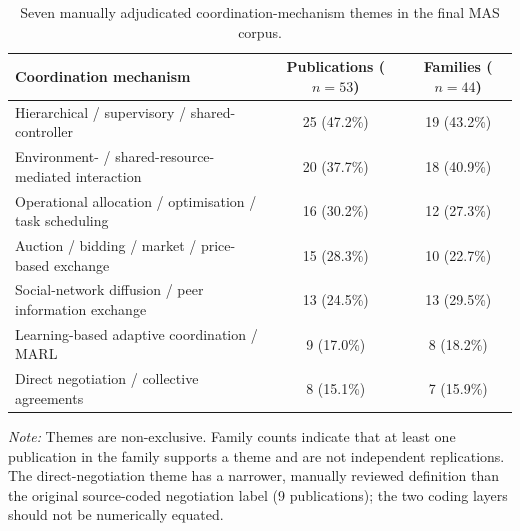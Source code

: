 \documentclass[11pt,a4paper]{article}
\begin{document}
\begin{table}[H]
\centering
\small

\caption{Seven manually adjudicated coordination-mechanism
themes in the final MAS corpus.}

\label{tab:rq2_coordination_mechanisms}

\begin{tabularx}{\textwidth}{@{}Xcc@{}}
\toprule

\textbf{Coordination mechanism} &
\textbf{Publications ($n=53$)} &
\textbf{Families ($n=44$)} \\

\midrule

Hierarchical / supervisory / shared-controller &
25 (47.2\%) & 19 (43.2\%) \\

Environment- / shared-resource-mediated interaction &
20 (37.7\%) & 18 (40.9\%) \\

Operational allocation / optimisation / task scheduling &
16 (30.2\%) & 12 (27.3\%) \\

Auction / bidding / market / price-based exchange &
15 (28.3\%) & 10 (22.7\%) \\

Social-network diffusion / peer information exchange &
13 (24.5\%) & 13 (29.5\%) \\

Learning-based adaptive coordination / MARL &
9 (17.0\%) & 8 (18.2\%) \\

Direct negotiation / collective agreements &
8 (15.1\%) & 7 (15.9\%) \\

\bottomrule
\end{tabularx}

\par\smallskip

\begin{minipage}{\textwidth}
\footnotesize

\emph{Note:} Themes are non-exclusive. Family counts
indicate that at least one publication in the family
supports a theme and are not independent replications.
The direct-negotiation theme has a narrower, manually
reviewed definition than the original source-coded negotiation label (9 publications);
the two coding layers should not be numerically equated.

\end{minipage}

\end{table}
\end{document}
